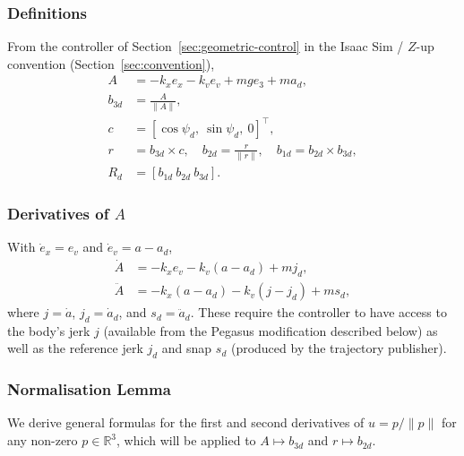 \documentclass[11pt]{article}
\theoremstyle{remark}
\newcommand{\R}{\mathbb{R}}
\begin{document}
\subsubsection{Definitions}
From the controller of Section~\ref{sec:geometric-control} in the Isaac Sim / $Z$-up convention (Section~\ref{sec:convention}),
\begin{align}
    A &= -k_x e_x - k_v e_v + m g e_3 + m a_d,\\
    b_{3d} &= \tfrac{A}{\|A\|},\\
    c &= [\cos\psi_d,\ \sin\psi_d,\ 0]^\top,\\
    r &= b_{3d}\times c,\quad b_{2d} = \tfrac{r}{\|r\|},\quad b_{1d} = b_{2d}\times b_{3d},\\
    R_d &= [b_{1d}\ b_{2d}\ b_{3d}].
\end{align}

\subsubsection{Derivatives of $A$}
With $\dot e_x = e_v$ and $\dot e_v = a - a_d$,
\begin{align}
\dot A &= -k_x e_v - k_v(a - a_d) + m j_d,\\
\ddot A &= -k_x(a - a_d) - k_v(j - j_d) + m s_d,
\end{align}
where $j = \dot a$, $j_d = \dot a_d$, and $s_d = \ddot a_d$. These require the controller to have access to the body's jerk $j$ (available from the Pegasus modification described below) as well as the reference jerk $j_d$ and snap $s_d$ (produced by the trajectory publisher).

\subsubsection{Normalisation Lemma}
We derive general formulas for the first and second derivatives of $u = p/\|p\|$ for any non-zero $p \in \R^3$, which will be applied to $A \mapsto b_{3d}$ and $r \mapsto b_{2d}$.
\end{document}
